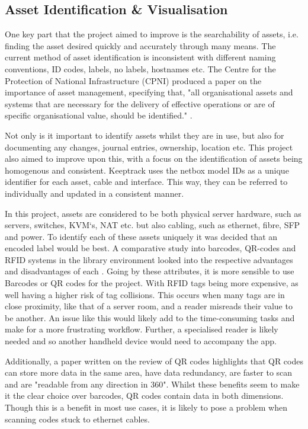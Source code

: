 \documentclass [11pt,a4paper]{article}
\begin{document}
\subsection{Asset Identification \& Visualisation}
\label{sec:technical}

One key part that the project aimed to improve is the searchability of assets, i.e. finding the asset desired quickly and accurately through many means. The current method of asset identification is inconsistent with different naming conventions, ID codes, labels, no labels, hostnames etc. The Centre for the Protection of National Infrastructure (CPNI) produced a paper on the importance of asset management, specifying that, "all organisational assets and systems that are necessary for the delivery of effective operations or are of specific organisational value, should be identified." \cite{cpni}.

Not only is it important to identify assets whilst they are in use, but also for documenting any changes, journal entries, ownership, location etc. This project also aimed to improve upon this, with a focus on the identification of assets being homogenous and consistent. Keeptrack uses the netbox model IDs as a unique identifier for each asset, cable and interface. This way, they can be referred to individually and updated in a consistent manner. 

In this project, assets are considered to be both physical server hardware, such as servers, switches, KVM`s, NAT etc. but also cabling, such as ethernet, fibre, SFP and power. To identify each of these assets uniquely it was decided that an encoded label would be best. A comparative study into barcodes, QR-codes and RFID systems in the library environment looked into the respective advantages and disadvantages of each \cite{lotlikar2013comparative}. Going by these attributes, it is more sensible to use Barcodes or QR codes for the project. With RFID tags being more expensive, as well having a higher risk of tag collisions. This occurs when many tags are in close proximity\cite{lotlikar2013comparative}, like that of a server room, and a reader misreads their value to be another. An issue like this would likely add to the time-consuming tasks and make for a more frustrating workflow. Further, a specialised reader is likely needed and so another handheld device would need to accompany the app.

Additionally, a paper written on the review of QR codes highlights that QR codes can store more data in the same area, have data redundancy, are faster to scan and are "readable from any direction in 360\degree"\cite{mishra2017review}. Whilst these benefits seem to make it the clear choice over barcodes, QR codes contain data in both dimensions. Though this is a benefit in most use cases, it is likely to pose a problem when scanning codes stuck to ethernet cables.
\end{document}
